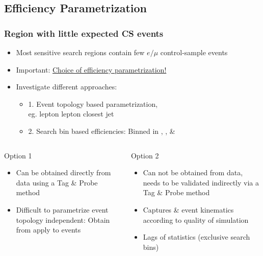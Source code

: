 \documentclass{beamer}
\begin{document}
\subsection{Efficiency Parametrization}
\begin{frame}
 \frametitle{Region with little expected CS events}
 \begin{itemize}
  \item Most sensitive search regions contain few $e/\mu$ control-sample events
  \item Important: \underline{Choice of efficiency parametrization!}
  \item Investigate different approaches:
  \begin{itemize}
   \item 1. Event topology based parametrization,\\ eg. \pt lepton \deltaR lepton closest jet
   \item 2. Search bin based efficiencies: Binned in \HT, \MHT, \NJets \& \BTags
  \end{itemize}
 \end{itemize}
 \noindent\makebox[\linewidth]{\rule{\textwidth}{0.4pt}}
 \begin{columns}
  \begin{column}{0.465\textwidth}
  Option 1
   \begin{itemize}
    \item Can be obtained directly from data using a Tag \& Probe method
    \item Difficult to parametrize event topology independent: Obtain from \Zll apply to \ttbar \wpj events
   \end{itemize}

  \end{column}
  \begin{column}{0.535\textwidth}
     Option 2
   \begin{itemize}
    \item Can not be obtained from data, needs to be validated indirectly via a Tag \& Probe method
    \item Captures \ttbar \& \wpj event kinematics according to quality of simulation
    \item Lags of statistics (exclusive search bins)
   \end{itemize}
  \end{column}

 \end{columns}
\end{frame}
\end{document}
